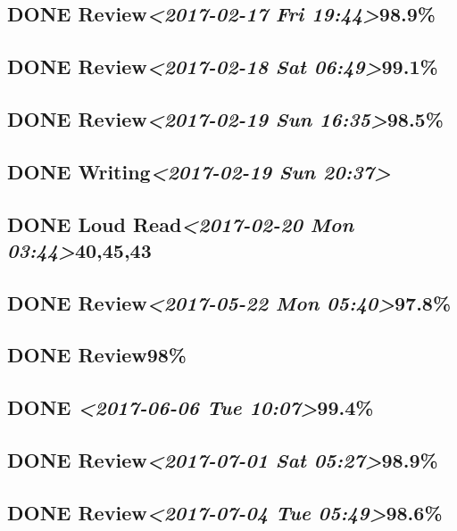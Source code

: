 \documentclass[11pt]{ctexart}
\begin{document}
\subsection{{\bfseries\sffamily DONE} Review\textit{<2017-02-17 Fri 19:44>}98.9\%}
\label{sec:org86a3754}
\subsection{{\bfseries\sffamily DONE} Review\textit{<2017-02-18 Sat 06:49>}99.1\%}
\label{sec:orgd7cb92a}
\subsection{{\bfseries\sffamily DONE} Review\textit{<2017-02-19 Sun 16:35>}98.5\%}
\label{sec:org5ba4a29}
\subsection{{\bfseries\sffamily DONE} Writing\textit{<2017-02-19 Sun 20:37>}}
\label{sec:org07e9b4a}
\subsection{{\bfseries\sffamily DONE} Loud Read\textit{<2017-02-20 Mon 03:44>}40,45,43}
\label{sec:org1535e76}
\subsection{{\bfseries\sffamily DONE} Review\textit{<2017-05-22 Mon 05:40>}97.8\%}
\label{sec:org7c4fde6}
\subsection{{\bfseries\sffamily DONE} Review98\%}
\label{sec:org67a0f2d}
\subsection{{\bfseries\sffamily DONE} \textit{<2017-06-06 Tue 10:07>}99.4\%}
\label{sec:org82ed396}
\subsection{{\bfseries\sffamily DONE} Review\textit{<2017-07-01 Sat 05:27>}98.9\%}
\label{sec:orgbf464ef}
\subsection{{\bfseries\sffamily DONE} Review\textit{<2017-07-04 Tue 05:49>}98.6\%}
\label{sec:orge30a851}
\end{document}
